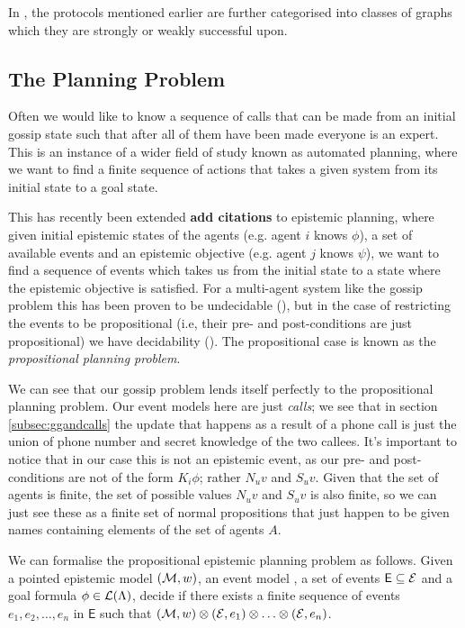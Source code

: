\documentclass[12pt, a4paper]{article} %
\begin{document}
In \cite{Ditmarsch:2016}, the protocols mentioned earlier are further categorised into classes of graphs which they are strongly or weakly successful upon.

\subsection{The Planning Problem}

Often we would like to know a sequence of calls that can be made from an initial gossip state such that after all of them have been made everyone is an expert. This is an instance of a wider field of study known as automated planning, where we want to find a finite sequence of actions that takes a given system from its initial state to a goal state. 

This has recently been extended \textbf{add citations} to epistemic planning, where given initial epistemic states of the agents (e.g. agent $i$ knows $\phi$), a set of available events and an epistemic objective (e.g. agent $j$ knows $\psi$), we want to find a sequence of events which takes us from the initial state to a state where the epistemic objective is satisfied. For a multi-agent system like the gossip problem this has been proven to be undecidable (\cite{Bolander:2012}), but in the case of restricting the events to be propositional (i.e, their pre- and post-conditions are just propositional) we have decidability (\cite{Aucher:2014}). The propositional case is known as the \textit{propositional planning problem}.

We can see that our gossip problem lends itself perfectly to the propositional planning problem. Our event models here are just \textit{calls}; we see that in section \ref{subsec:ggandcalls} the update that happens as a result of a phone call is just the union of phone number and secret knowledge of the two callees. It's important to notice that in our case this is not an epistemic event, as our pre- and post-conditions are not of the form $K_i \phi$; rather $N_u v$ and $S_u v$. Given that the set of agents is finite, the set of possible values $N_u v$ and $S_u v$ is also finite, so we can just see these as a finite set of normal propositions that just happen to be given names containing elements of the set of agents $A$.

We can formalise the propositional epistemic planning problem as follows. Given a pointed epistemic model $(\mathcal{M}, w)$, an event model , a set of events $\textsf{E} \subseteq \mathcal{E}$ and a goal formula $\phi \in \mathcal{L}(\Lambda)$, decide if there exists a finite sequence of events $e_1, e_2, \ldots, e_n$ in $\textsf{E}$ such that $(\mathcal{M}, w) \otimes (\mathcal{E}, e_1) \otimes \ldots \otimes (\mathcal{E}, e_n)$.
\end{document}
